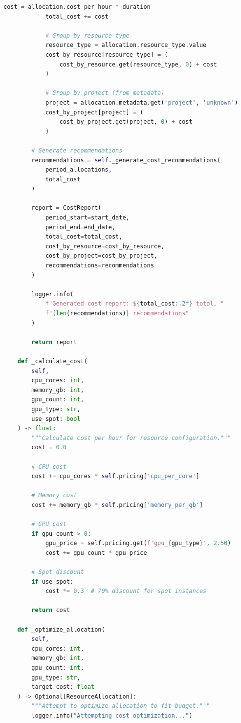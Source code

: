 \begin{lstlisting}[language=Python, caption={Resource Management with Cost Optimization}]
            cost = allocation.cost_per_hour * duration
            total_cost += cost

            # Group by resource type
            resource_type = allocation.resource_type.value
            cost_by_resource[resource_type] = (
                cost_by_resource.get(resource_type, 0) + cost
            )

            # Group by project (from metadata)
            project = allocation.metadata.get('project', 'unknown')
            cost_by_project[project] = (
                cost_by_project.get(project, 0) + cost
            )

        # Generate recommendations
        recommendations = self._generate_cost_recommendations(
            period_allocations,
            total_cost
        )

        report = CostReport(
            period_start=start_date,
            period_end=end_date,
            total_cost=total_cost,
            cost_by_resource=cost_by_resource,
            cost_by_project=cost_by_project,
            recommendations=recommendations
        )

        logger.info(
            f"Generated cost report: ${total_cost:.2f} total, "
            f"{len(recommendations)} recommendations"
        )

        return report

    def _calculate_cost(
        self,
        cpu_cores: int,
        memory_gb: int,
        gpu_count: int,
        gpu_type: str,
        use_spot: bool
    ) -> float:
        """Calculate cost per hour for resource configuration."""
        cost = 0.0

        # CPU cost
        cost += cpu_cores * self.pricing['cpu_per_core']

        # Memory cost
        cost += memory_gb * self.pricing['memory_per_gb']

        # GPU cost
        if gpu_count > 0:
            gpu_price = self.pricing.get(f'gpu_{gpu_type}', 2.50)
            cost += gpu_count * gpu_price

        # Spot discount
        if use_spot:
            cost *= 0.3  # 70% discount for spot instances

        return cost

    def _optimize_allocation(
        self,
        cpu_cores: int,
        memory_gb: int,
        gpu_count: int,
        gpu_type: str,
        target_cost: float
    ) -> Optional[ResourceAllocation]:
        """Attempt to optimize allocation to fit budget."""
        logger.info("Attempting cost optimization...")


\end{lstlisting}
